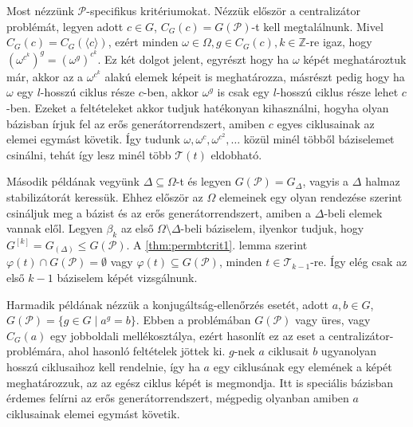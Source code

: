 Most nézzünk $\mathcal{P}$-specifikus kritériumokat.
Nézzük először a centralizátor problémát, legyen adott $c \in G$, $C_G(c) = G(\mathcal{P})$-t kell megtalálnunk.
Mivel $C_G(c) = C_G(\langle c \rangle)$, ezért minden $\omega \in \Omega, g \in C_G(c), k \in \mathbb{Z}$-re igaz, hogy $(\omega^{c^k})^g = (\omega^g)^{c^k}$.
Ez két dolgot jelent, egyrészt hogy ha $\omega$ képét meghatároztuk már, akkor az a $\omega^{c^k}$ alakú elemek képeit is meghatározza,
másrészt pedig hogy ha $\omega$ egy $l$-hosszú ciklus része $c$-ben, akkor $\omega^g$ is csak egy $l$-hosszú ciklus része lehet $c$-ben.
Ezeket a feltételeket akkor tudjuk hatékonyan kihasználni, hogyha olyan bázisban írjuk fel az erős generátorrendszert, amiben $c$ egyes ciklusainak az elemei egymást követik.
Így tudunk $\omega, \omega^c, \omega^{c^2}, \dots$ közül minél többől báziselemet csinálni, tehát így lesz minél több $\mathcal{T}(t)$ eldobható.

Második példának vegyünk $\Delta \subseteq \Omega$-t és legyen $G(\mathcal{P}) = G_{\Delta}$, vagyis a $\Delta$ halmaz stabilizátorát keressük.
Ehhez először az $\Omega$ elemeinek egy olyan rendezése szerint csináljuk meg a bázist és az erős generátorrendszert, amiben a $\Delta$-beli elemek vannak elől.
Legyen $\beta_k$ az első $\Omega \setminus \Delta$-beli báziselem, ilyenkor tudjuk, hogy $G^{[k]} = G_{(\Delta)} \le G(\mathcal{P})$.
A \ref{thm:permbtcrit1}. lemma szerint $\varphi(t) \cap G(\mathcal{P}) = \emptyset$ vagy $\varphi(t) \subseteq G(\mathcal{P})$, minden $t \in \mathcal{T}_{k-1}$-re.
Így elég csak az első $k-1$ báziselem képét vizsgálnunk.

Harmadik példának nézzük a konjugáltság-ellenőrzés esetét, adott $a, b \in G$, $G(\mathcal{P}) = \{g \in G \mid a^g = b \}$.
Ebben a problémában $G(\mathcal{P})$ vagy üres, vagy $C_G(a)$ egy jobboldali mellékosztálya, ezért hasonlít ez az eset a centralizátor-problémára, ahol hasonló feltételek jöttek ki.
$g$-nek $a$ ciklusait $b$ ugyanolyan hosszú ciklusaihoz kell rendelnie, így ha $a$ egy ciklusának egy elemének a képét meghatározzuk, az az egész ciklus képét is megmondja.
Itt is speciális bázisban érdemes felírni az erős generátorrendszert, mégpedig olyanban amiben $a$ ciklusainak elemei egymást követik.


